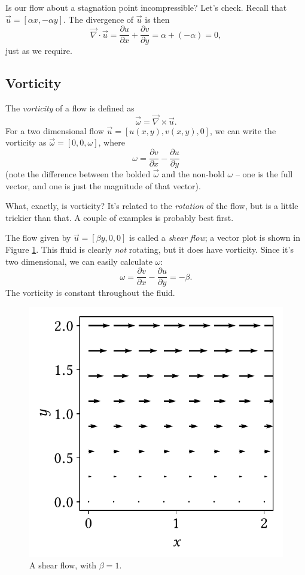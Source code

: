 \begin{example}
\label{ex_stag_point2}
Is our flow about a stagnation point incompressible?  Let's check.  Recall that $\vec{u} = [\alpha x, -\alpha y]$.  The divergence of $\vec{u}$ is then
\[
\vec{\nabla} \cdot \vec{u} = \frac{\partial u}{\partial x} + \frac{\partial v}{\partial y} = \alpha + (-\alpha) = 0,
\]
just as we require.
\end{example}


\subsection{Vorticity}

The \emph{vorticity} of a flow is defined as
\begin{equation}
\boxed{
\vec{\omega} = \vec{\nabla} \times \vec{u}.
}
\end{equation}
For a two dimensional flow $\vec{u} = [u(x, y), v(x, y), 0]$, we can write the vorticity as $\vec{\omega} = [0,0,\omega]$, where
\[
\omega = \frac{\partial v}{\partial x} - \frac{\partial u}{\partial y}
\]
(note the difference between the bolded $\vec{\omega}$ and the non-bold $\omega$ -- one is the full vector, and one is just the magnitude of that vector).

What, exactly, is vorticity?  It's related to the \emph{rotation} of the flow, but is a little trickier than that.  A couple of examples is probably best first.

\begin{example}
The flow given by $\vec{u} = [\beta y, 0, 0]$ is called a \emph{shear flow}; a vector plot is shown in Figure \ref{fig_shear}.  This fluid is clearly \emph{not} rotating, but it does have vorticity.  Since it's two dimensional, we can easily calculate $\omega$:
\[
\omega = \frac{\partial v}{\partial x} - \frac{\partial u}{\partial y} = -\beta.
\]
The vorticity is constant throughout the fluid.
\end{example}

\begin{figure}
\centering
\includegraphics[width=0.5\linewidth]{Figures/Chapter1/fig_shear_vector}
\caption{A shear flow, with $\beta = 1$.}
\label{fig_shear}
\end{figure}

